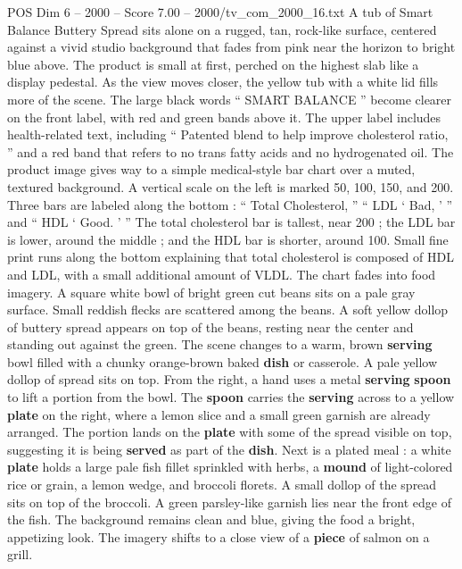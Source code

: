 \begin{textsample}{POS Dim 6 – 2000 – Score 7.00 – 2000/tv\_com\_2000\_16.txt}  \label{ex:f6_pos_059}
A tub of Smart Balance Buttery Spread sits alone on a rugged, tan, rock-like surface, centered against a vivid studio background that fades from pink near the horizon to bright blue above.
The product is small at first, perched on the highest slab like a display pedestal.
As the view moves closer, the yellow tub with a white lid fills more of the scene.
The large black words “ SMART BALANCE ” become clearer on the front label, with red and green bands above it.
The upper label includes health-related text, including “ Patented blend to help improve cholesterol ratio, ” and a red band that refers to no trans fatty acids and no hydrogenated oil.
The product image gives way to a simple medical-style bar chart over a muted, textured background.
A vertical scale on the left is marked 50, 100, 150, and 200.
Three bars are labeled along the bottom : “ Total Cholesterol, ” “ LDL ‘ Bad, ’ ” and “ HDL ‘ Good. ’ ” The total cholesterol bar is tallest, near 200 ; the LDL bar is lower, around the middle ; and the HDL bar is shorter, around 100.
Small fine print runs along the bottom explaining that total cholesterol is composed of HDL and LDL, with a small additional amount of VLDL.
The chart fades into food imagery.
A square white bowl of bright green cut beans sits on a pale gray surface.
Small reddish flecks are scattered among the beans.
A soft yellow dollop of buttery spread appears on top of the beans, resting near the center and standing out against the green.
The scene changes to a warm, brown \textbf{serving} bowl filled with a chunky orange-brown baked \textbf{dish} or casserole.
A pale yellow dollop of spread sits on top.
From the right, a hand uses a metal \textbf{serving} \textbf{spoon} to lift a portion from the bowl.
The \textbf{spoon} carries the \textbf{serving} across to a yellow \textbf{plate} on the right, where a lemon slice and a small green garnish are already arranged.
The portion lands on the \textbf{plate} with some of the spread visible on top, suggesting it is being \textbf{served} as part of the \textbf{dish}.
Next is a plated meal : a white \textbf{plate} holds a large pale fish fillet sprinkled with herbs, a \textbf{mound} of light-colored rice or grain, a lemon wedge, and broccoli florets.
A small dollop of the spread sits on top of the broccoli.
A green parsley-like garnish lies near the front edge of the fish.
The background remains clean and blue, giving the food a bright, appetizing look.
The imagery shifts to a close view of a \textbf{piece} of salmon on a grill.

\end{textsample}
